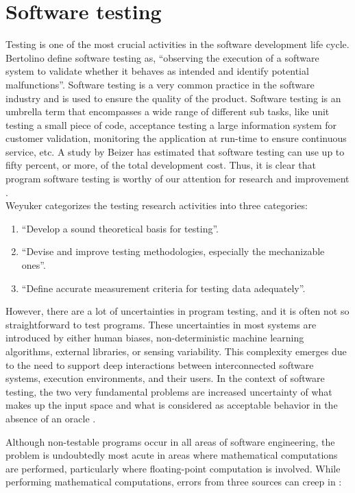 \section{Software testing}
Testing is one of the most crucial activities in the software development life cycle. Bertolino \cite{Bertolino2007} define software testing as, \enquote{observing the execution of a software system to validate whether it behaves as intended and identify potential malfunctions}. Software testing is a very common practice in the software industry and is used to ensure the quality of the product. Software testing is an umbrella term that encompasses a wide range of different sub tasks, like unit testing a small piece of code, acceptance testing a large information system for customer validation, monitoring the application at run-time to ensure continuous service, etc.\cite{Bertolino2007} A study by Beizer \cite{Beizer1990} has estimated that software testing can use up to fifty percent, or more, of the total development cost. Thus, it is clear that program software testing is worthy of our attention for research and improvement \cite{Beizer1990}.\\
Weyuker \cite{Weyuker} categorizes the testing research activities into three categories:
\begin{enumerate}
  \item \enquote{Develop a sound theoretical basis for testing}.
  \item \enquote{Devise and improve testing methodologies, especially the mechanizable ones}.
  \item \enquote{Define accurate measurement criteria for testing data adequately}.
\end{enumerate}

However,  there are a lot of uncertainties in program testing, and it is often not so straightforward to test programs. These uncertainties in most systems are introduced by either human biases, non-deterministic machine learning algorithms, external libraries, or sensing variability. This complexity emerges due to the need to support deep interactions between interconnected software systems, execution environments, and their users. In the context of software testing, the two very fundamental problems are increased uncertainty of what makes up the input space and what is considered as acceptable behavior in the absence of an oracle \cite{Chen2002,Elbaum2014}.

Although non-testable programs occur in all areas of software engineering, the problem is undoubtedly most acute in areas where mathematical computations are performed, particularly where floating-point computation is involved. While performing mathematical computations, errors from three sources can creep in \cite{Weyuker}:


